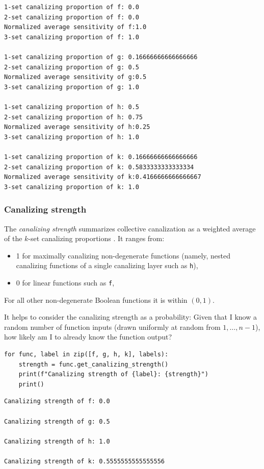 \documentclass[
]{article}
\providecommand{\tightlist}{%
  \setlength{\itemsep}{0pt}\setlength{\parskip}{0pt}}
\begin{document}
\begin{lstlisting}
1-set canalizing proportion of f: 0.0
2-set canalizing proportion of f: 0.0
Normalized average sensitivity of f:1.0
3-set canalizing proportion of f: 1.0

1-set canalizing proportion of g: 0.16666666666666666
2-set canalizing proportion of g: 0.5
Normalized average sensitivity of g:0.5
3-set canalizing proportion of g: 1.0

1-set canalizing proportion of h: 0.5
2-set canalizing proportion of h: 0.75
Normalized average sensitivity of h:0.25
3-set canalizing proportion of h: 1.0

1-set canalizing proportion of k: 0.16666666666666666
2-set canalizing proportion of k: 0.5833333333333334
Normalized average sensitivity of k:0.4166666666666667
3-set canalizing proportion of k: 1.0
\end{lstlisting}

\subsubsection{Canalizing strength}\label{canalizing-strength}

The \emph{canalizing strength} summarizes collective canalization as a
weighted average of the \(k\)-set canalizing proportions
\citep{kadelka2023collectively}. It ranges from:

\begin{itemize}
\tightlist
\item
  1 for maximally canalizing non-degenerate functions (namely, nested
  canalizing functions of a single canalizing layer such as \texttt{h}),
\item
  0 for linear functions such as \texttt{f},
\end{itemize}

For all other non-degenerate Boolean functions it is within \((0,1)\).

It helps to consider the canalizing strength as a probability: Given
that I know a random number of function inputs (drawn uniformly at
random from \(1,\ldots,n-1\)), how likely am I to already know the
function output?

\begin{lstlisting}
for func, label in zip([f, g, h, k], labels):
    strength = func.get_canalizing_strength()
    print(f"Canalizing strength of {label}: {strength}")
    print()
\end{lstlisting}

\begin{lstlisting}
Canalizing strength of f: 0.0

Canalizing strength of g: 0.5

Canalizing strength of h: 1.0

Canalizing strength of k: 0.5555555555555556
\end{lstlisting}
\end{document}
